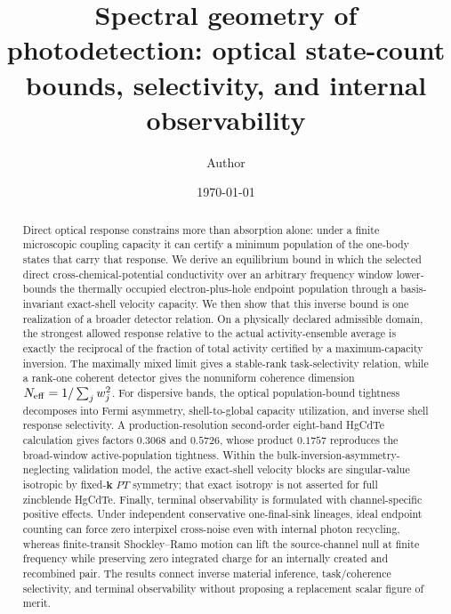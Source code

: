 \documentclass[aps,twocolumn,superscriptaddress,longbibliography]{revtex4-2}
\begin{document}
\title{Spectral geometry of photodetection: optical state-count bounds, selectivity, and internal observability}

\author{Author}

\date{\today}

\begin{abstract}
Direct optical response constrains more than absorption alone: under a finite microscopic coupling capacity it can certify a minimum population of the one-body states that carry that response. We derive an equilibrium bound in which the selected direct cross-chemical-potential conductivity over an arbitrary frequency window lower-bounds the thermally occupied electron-plus-hole endpoint population through a basis-invariant exact-shell velocity capacity. We then show that this inverse bound is one realization of a broader detector relation. On a physically declared admissible domain, the strongest allowed response relative to the actual activity-ensemble average is exactly the reciprocal of the fraction of total activity certified by a maximum-capacity inversion. The maximally mixed limit gives a stable-rank task-selectivity relation, while a rank-one coherent detector gives the nonuniform coherence dimension $N_{\rm eff}=1/\sum_j w_j^2$. For dispersive bands, the optical population-bound tightness decomposes into Fermi asymmetry, shell-to-global capacity utilization, and inverse shell response selectivity. A production-resolution second-order eight-band HgCdTe calculation gives factors $0.3068$ and $0.5726$, whose product $0.1757$ reproduces the broad-window active-population tightness. Within the bulk-inversion-asymmetry-neglecting validation model, the active exact-shell velocity blocks are singular-value isotropic by fixed-$\mathbf k$ $PT$ symmetry; that exact isotropy is not asserted for full zincblende HgCdTe. Finally, terminal observability is formulated with channel-specific positive effects. Under independent conservative one-final-sink lineages, ideal endpoint counting can force zero interpixel cross-noise even with internal photon recycling, whereas finite-transit Shockley--Ramo motion can lift the source-channel null at finite frequency while preserving zero integrated charge for an internally created and recombined pair. The results connect inverse material inference, task/coherence selectivity, and terminal observability without proposing a replacement scalar figure of merit.
\end{abstract}
\end{document}
